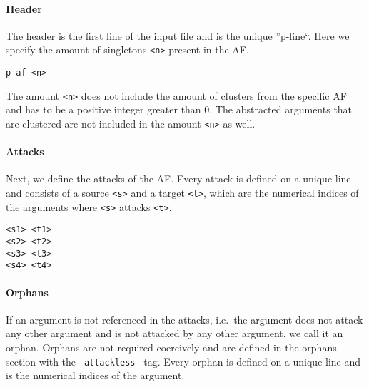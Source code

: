 \paragraph{Header} The header is the first line of the input file and is the unique ''p-line``. Here we specify the amount of singletons \texttt{<n>} present in the AF.

\vspace{0.3cm}
\begin{center}
    \texttt{p af <n>}
\end{center}
\vspace{0.3cm}

The amount \texttt{<n>} does not include the amount of clusters from the specific AF and has to be a positive integer greater than $0$. The abstracted arguments that are clustered are not included in the amount \texttt{<n>} as well.

\paragraph{Attacks} Next, we define the attacks of the AF. Every attack is defined on a unique line and consists of a source \texttt{<s>} and a target \texttt{<t>}, which are the numerical indices of the arguments where \texttt{<s>} attacks \texttt{<t>}.

\vspace{0.3cm}
\begin{center}
    \texttt{<s1> <t1>}\\
    \texttt{<s2> <t2>}\\
    \texttt{<s3> <t3>}\\
    \texttt{<s4> <t4>}
\end{center}
\vspace{0.3cm}



\paragraph{Orphans} If an argument is not referenced in the attacks, i.e.\ the argument does not attack any other argument and is not attacked by any other argument, we call it an orphan. Orphans are not required coercively and are defined in the orphans section with the \texttt{--attackless--} tag. Every orphan is defined on a unique line and is the numerical indices of the argument.

\vspace{0.3cm}
\begin{center}
    \hspace{2.25cm}
\end{center}
\vspace{0.3cm}




